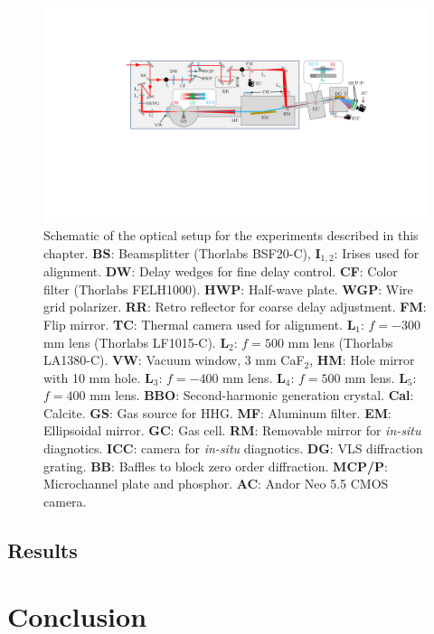 \begin{figure}
	\centering
	\includegraphics[width=1.0\textwidth]{figures/CATS/beamline_schematic_CATS.pdf}
	\caption[TABLe experimental setup for ATS experiments]{Schematic of the optical setup for the experiments described in this chapter.  \textbf{BS}: Beamsplitter (Thorlabs BSF20-C), \textbf{I$_{1,2}$}: Irises used for alignment. \textbf{DW}: Delay wedges for fine delay control. \textbf{CF}: Color filter (Thorlabs FELH1000). \textbf{HWP}: Half-wave plate. \textbf{WGP}: Wire grid polarizer. \textbf{RR}: Retro reflector for coarse delay adjustment.  \textbf{FM}: Flip mirror. \textbf{TC}: Thermal camera used for alignment.  \textbf{L$_1$}: $f=-300$ mm lens (Thorlabs LF1015-C). \textbf{L$_2$}: $f=500$ mm lens (Thorlabs LA1380-C). \textbf{VW}: Vacuum window, 3 mm CaF$_2$, \textbf{HM}: Hole mirror with 10 mm hole.  \textbf{L$_3$}: $f=-400$ mm lens.  \textbf{L$_4$}: $f=500$ mm lens. \textbf{L$_5$}: $f=400$ mm lens.  \textbf{BBO}: Second-harmonic generation crystal.  \textbf{Cal}: Calcite. \textbf{GS}: Gas source for HHG. \textbf{MF}: Aluminum filter. \textbf{EM}: Ellipsoidal mirror. \textbf{GC}: Gas cell. \textbf{RM}: Removable mirror for \textit{in-situ} diagnotics.    \textbf{ICC}: camera for \textit{in-situ} diagnotics. \textbf{DG}: VLS diffraction grating. \textbf{BB}: Baffles to block zero order diffraction.  \textbf{MCP/P}: Microchannel plate and phosphor.  \textbf{AC}: Andor Neo 5.5 CMOS camera.}
	\label{fig:CATS_setup}
\end{figure}



\subsection{Results}
\label{sec:CATS_ar_results}


\section{Conclusion}
\label{sec:CATS_conclusion}